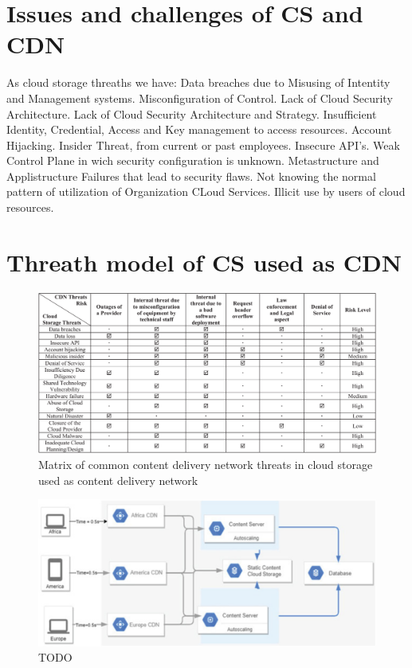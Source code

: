 \documentclass[14pt,oneside]{extreport}
\newcommand*\fpar{\hspace{1ex}}
\begin{document}
\section{Issues and challenges of CS and CDN}
\fpar As cloud storage threaths we have: Data breaches due to Misusing of Intentity and Management systems. Misconfiguration of Control. Lack of Cloud Security Architecture. Lack of Cloud Security Architecture and Strategy. Insufficient Identity, Credential, Access and Key management to access resources. Account Hijacking. Insider Threat, from current or past employees. Insecure API's. Weak Control Plane in wich security configuration is unknown. Metastructure and Applistructure Failures that lead to security flaws. Not knowing the normal pattern of utilization of Organization CLoud Services. Illicit use by users of cloud resources.
\section{Threath model of CS used as CDN}
\fpar
\begin{figure}[H]
    \centering
    \includegraphics[width=\textwidth]{paper3/3_table.png}
    \caption{Matrix of common content delivery network threats in cloud storage used as content delivery network}
    \label{fig:table}
\end{figure}
\begin{figure}[H]
  \centering
  \includegraphics[width=\textwidth]{paper3/threats.png}
  \caption{TODO}
  \label{fig:TODO}
\end{figure}
\end{document}

